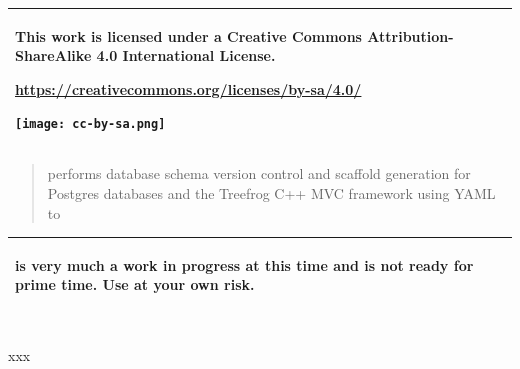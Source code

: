 \documentclass[]{article}
\title{}
\author{
	  Carbone, John\\
	\texttt{john@qlcorp.net}
}
\begin{document}
\maketitle
\begin{tabular}{|p{}|}
	\hline
	\rowcolor{LightYellow}
	\begin{center}
		This work is licensed under a Creative Commons Attribution-ShareAlike 4.0 International License.
	\end{center}
\begin{center}
	\url{https://creativecommons.org/licenses/by-sa/4.0/}
\end{center}
	\begin{center}
		\texttt{[image: cc-by-sa.png]}
	\end{center}\\
	\hline
\end{tabular}

\begin{abstract}
 performs database schema version control and scaffold generation for Postgres databases and the Treefrog C++ MVC framework using YAML to 
\end{abstract}

\begin{tabular}{|p{}|}
	\hline
	\rowcolor{LightRed}
	\begin{center}
		 is very much a work in progress at this time and is not ready for prime time. Use at your own risk.
	\end{center}\\
	\hline
\end{tabular}
\\
xxx
\end{document}
